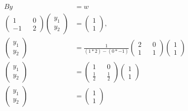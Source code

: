 \documentclass[12pt]{article}
\makeatletter
\theoremstyle{homework}
\newenvironment{exercise}[1]
{\def\@currentlabel{#1}\exercisecore}
{\endexercisecore}
\makeatother
\begin{document}
\begin{exercise}{2}
\begin{enumerate}
  \begin{align*}
    By &= w\\
    \begin{pmatrix}
      1 && 0 \\
      -1 && 2 
    \end{pmatrix} 
    \begin{pmatrix}
      y_1 \\
      y_2 
    \end{pmatrix}
    &=
    \begin{pmatrix}
      1 \\
      1 
    \end{pmatrix},\\
    \begin{pmatrix}
      y_1 \\
      y_2 
    \end{pmatrix}
    &=
    \frac{1}{(1*2)-(0*-1)}
    \begin{pmatrix}
      2 && 0 \\
      1 && 1 
    \end{pmatrix}
    \begin{pmatrix}
      1 \\
      1 
    \end{pmatrix}\\
    \begin{pmatrix}
      y_1 \\
      y_2 
    \end{pmatrix}
    &=
    \begin{pmatrix}
      1 && 0 \\
      \frac{1}{2} && \frac{1}{2} 
    \end{pmatrix}
    \begin{pmatrix}
      1 \\
      1 
    \end{pmatrix}\\
    \begin{pmatrix}
      y_1 \\
      y_2 
    \end{pmatrix}
    &=
    \begin{pmatrix}
      1 \\
      1 
    \end{pmatrix}
  \end{align*}


\end{enumerate}
\end{exercise}
\end{document}
